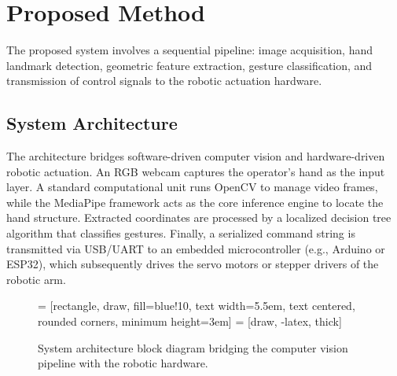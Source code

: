 \documentclass[conference]{IEEEtran}
\begin{document}
\section{Proposed Method}
The proposed system involves a sequential pipeline: image acquisition, hand landmark detection, geometric feature extraction, gesture classification, and transmission of control signals to the robotic actuation hardware.

\subsection{System Architecture}
The architecture bridges software-driven computer vision and hardware-driven robotic actuation. An RGB webcam captures the operator's hand as the input layer. A standard computational unit runs OpenCV to manage video frames, while the MediaPipe framework acts as the core inference engine to locate the hand structure. Extracted coordinates are processed by a localized decision tree algorithm that classifies gestures. Finally, a serialized command string is transmitted via USB/UART to an embedded microcontroller (e.g., Arduino or ESP32), which subsequently drives the servo motors or stepper drivers of the robotic arm.

\begin{figure}[H]
    \centering
     = [rectangle, draw, fill=blue!10, text width=5.5em, text centered, rounded corners, minimum height=3em]
     = [draw, -latex, thick]
    \caption{System architecture block diagram bridging the computer vision pipeline with the robotic hardware.}
    \label{fig:arch_diagram}
\end{figure}
\end{document}

